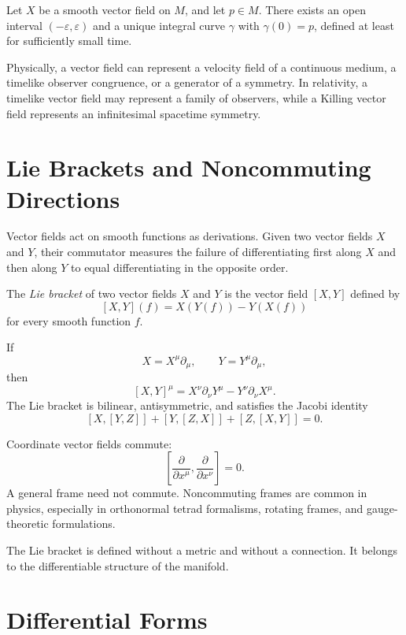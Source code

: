 \begin{theorembox}
Let \(X\) be a smooth vector field on \(M\), and let \(p\in M\). There exists an
open interval \((-\varepsilon,\varepsilon)\) and a unique integral curve
\(\gamma\) with \(\gamma(0)=p\), defined at least for sufficiently small time.
\end{theorembox}

Physically, a vector field can represent a velocity field of a continuous
medium, a timelike observer congruence, or a generator of a symmetry. In
relativity, a timelike vector field may represent a family of observers, while a
Killing vector field represents an infinitesimal spacetime symmetry.

\clearpage

\section{Lie Brackets and Noncommuting Directions}

Vector fields act on smooth functions as derivations. Given two vector fields
\(X\) and \(Y\), their commutator measures the failure of differentiating first
along \(X\) and then along \(Y\) to equal differentiating in the opposite order.

\begin{definitionbox}
The \emph{Lie bracket} of two vector fields \(X\) and \(Y\) is the vector field
\([X,Y]\) defined by
\[
[X,Y](f)=X(Y(f))-Y(X(f))
\]
for every smooth function \(f\).
\end{definitionbox}

If
\[
X=X^\mu\partial_\mu,
\qquad
Y=Y^\mu\partial_\mu,
\]
then
\[
[X,Y]^\mu=X^\nu\partial_\nu Y^\mu-Y^\nu\partial_\nu X^\mu.
\]
The Lie bracket is bilinear, antisymmetric, and satisfies the Jacobi identity
\[
[X,[Y,Z]]+[Y,[Z,X]]+[Z,[X,Y]]=0.
\]

Coordinate vector fields commute:
\[
\left[\frac{\partial}{\partial x^\mu},
\frac{\partial}{\partial x^\nu}\right]=0.
\]
A general frame need not commute. Noncommuting frames are common in physics,
especially in orthonormal tetrad formalisms, rotating frames, and gauge-theoretic
formulations.

The Lie bracket is defined without a metric and without a connection. It belongs
to the differentiable structure of the manifold.

\clearpage

\section{Differential Forms}

